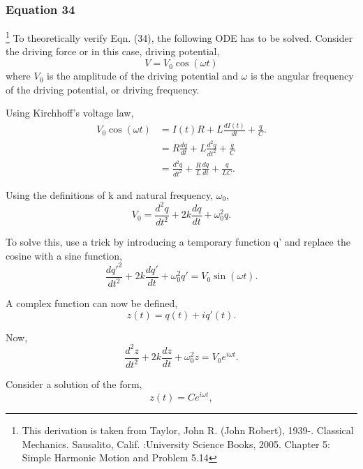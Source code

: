\documentclass{article}
\begin{document}
\subsubsection{Equation 34} \label{d2}
\footnote{This derivation is taken from Taylor, John R. (John Robert), 1939-. Classical Mechanics. Sausalito, Calif. :University Science Books, 2005. Chapter 5: Simple Harmonic Motion and Problem 5.14}
To theoretically verify Eqn. (34), the following ODE has
to be solved. Consider the driving force or in this case, driving 
potential,
\begin{equation}
    V = V_0\cos{(\omega t)}
\end{equation}
where $V_0$ is the amplitude of the driving potential and $\omega$ 
is the angular frequency of the driving potential, or driving 
frequency.

Using Kirchhoff's voltage law,
\begin{equation}
    \begin{split}
    V_0\cos{(\omega t)} &= I(t)R + L \frac{dI(t)}{dt} + \frac{q}{C}. \\
    &= R\frac{dq}{dt} + L \frac{d^2q}{dt^2} + \frac{q}{C} \\
    &= \frac{d^2q}{dt^2} + \frac{R}{L}\frac{dq}{dt} + \frac{q}{LC}.   
    \end{split}
\end{equation}

Using the definitions of k and natural frequency, $\omega_0$,
\begin{equation}
    V_0 = \frac{d^2q}{dt^2} + 2k\frac{dq}{dt} + \omega_0^2q.
\end{equation}

To solve this, use a trick by introducing a temporary function q'
and replace the cosine with a sine function,
\begin{equation}
    \frac{dq'^2}{dt^2}+2k\frac{dq'}{dt} + \omega_0^2q' = V_0\sin{(\omega t)}.
\end{equation}

A complex function can now be defined,
\begin{equation}
    z(t) = q(t) + iq'(t).
\end{equation}

Now,
\begin{equation}
    \frac{d^2z}{dt^2} + 2k\frac{dz}{dt} + \omega_0^2z = V_0e^{i\omega t}.
\end{equation}

Consider a solution of the form,
\begin{equation}
    z(t) = Ce^{i\omega t},
\end{equation}
\end{document}

